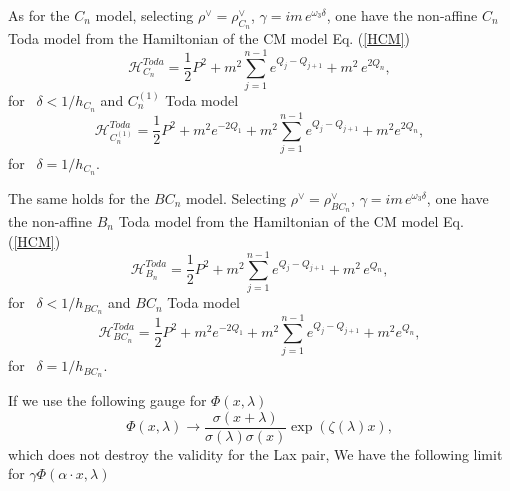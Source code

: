 \documentclass[a4paper,12pt]{article}
\begin{document}
As for the $C_{n}$ model, selecting $\rho^{\vee }=
\rho _{C_{n}}^{\vee }$, $\gamma =im\,e^{\omega _{3}\delta }$, one have the
non-affine $C_{n}$ Toda model from the Hamiltonian of the CM
model Eq. (\ref{HCM})
\begin{equation}
\mathcal{H}_{C_{n}}^{\mathit{Toda}}={\frac{1}{2}}P^{2}+m^{2}
\sum_{j=1}^{n-1}e^{Q_{j}-Q_{j+1}}+m^{2}\,e^{2Q_{n}},
\end{equation}
for \ $\delta <1/h_{C_{n}}$ and $C_{n}^{(1)}$ Toda model
\begin{equation}
\mathcal{H}_{C_{n}^{(1)}}^{\mathit{Toda}}={\frac{1}{2}}
P^{2}+m^{2}e^{-2Q_{1}}+m^{2}\sum_{j=1}^{n-1}e^{Q_{j}-Q_{j+1}}+m^{2}e^{2Q_{n}},
\end{equation}
for \ $\delta =1/h_{C_{n}}$.



The same holds for the $BC_{n}$ model. Selecting $\rho^{\vee }=
\rho _{BC_{n}}^{\vee }$, $\gamma =im\,e^{\omega _{3}\delta }$, one have the
non-affine $B_{n}$ Toda model from the Hamiltonian of the CM
model Eq. (\ref{HCM})
\begin{equation}
\mathcal{H}_{B_{n}}^{\mathit{Toda}}={\frac{1}{2}}P^{2}+m^{2}
\sum_{j=1}^{n-1}e^{Q_{j}-Q_{j+1}}+m^{2}\,e^{Q_{n}},
\end{equation}
for \ $\delta <1/h_{BC_{n}}$ and $BC_{n}$ Toda model
\begin{equation}
\mathcal{H}_{BC_{n}}^{\mathit{Toda}}={\frac{1}{2}}
P^{2}+m^{2}e^{-2Q_{1}}+m^{2}\sum_{j=1}^{n-1}e^{Q_{j}-Q_{j+1}}+m^{2}e^{Q_{n}},
\end{equation}
for \ $\delta =1/h_{BC_{n}}$.

If we use the following gauge for $\Phi (x,\lambda )$
\cite{Kri}
\begin{equation}
\Phi (x,\lambda )\rightarrow {\frac{\sigma (x+\lambda )}{{\sigma (\lambda
)\sigma (x)}}}\exp ({\zeta (\lambda )x}),  \label{funx}
\end{equation}
which does not destroy the validity\cite{kst} for the Lax
pair, We have the following limit for $\gamma \Phi (\alpha
\cdot x,\lambda )$
\end{document}
